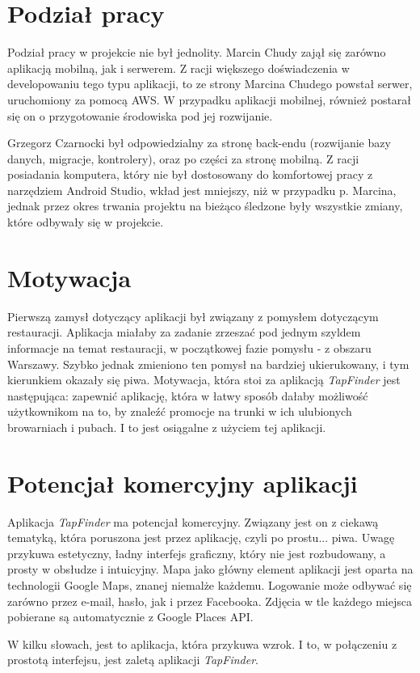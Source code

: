 \documentclass[a4paper]{article}
\begin{document}
\section{Podział pracy}

Podział pracy w projekcie nie był jednolity. Marcin Chudy zajął się zarówno aplikacją mobilną, jak i serwerem. Z racji większego doświadczenia w developowaniu tego typu aplikacji, to ze strony Marcina Chudego powstał serwer, uruchomiony za pomocą AWS. W przypadku aplikacji mobilnej, również postarał się on o przygotowanie środowiska pod jej rozwijanie.

Grzegorz Czarnocki był odpowiedzialny za stronę back-endu (rozwijanie bazy danych, migracje, kontrolery), oraz po części za stronę mobilną. Z racji posiadania komputera, który nie był dostosowany do komfortowej pracy z narzędziem Android Studio, wkład jest mniejszy, niż w przypadku p. Marcina, jednak przez okres trwania projektu na bieżąco śledzone były wszystkie zmiany, które odbywały się w projekcie.

\section{Motywacja}

Pierwszą zamysł dotyczący aplikacji był związany z pomysłem dotyczącym restauracji. Aplikacja miałaby za zadanie zrzeszać pod jednym szyldem informacje na temat restauracji, w początkowej fazie pomysłu - z obszaru Warszawy. Szybko jednak zmieniono ten pomysł na bardziej ukierukowany, i tym kierunkiem okazały się piwa. Motywacja, która stoi za aplikacją \textit{TapFinder} jest następująca: zapewnić aplikację, która w łatwy sposób dałaby możliwość użytkownikom na to, by znaleźć promocje na trunki w ich ulubionych browarniach i pubach. I to jest osiągalne z użyciem tej aplikacji.

\section{Potencjał komercyjny aplikacji}

Aplikacja \textit{TapFinder} ma potencjał komercyjny. Związany jest on z ciekawą tematyką, która poruszona jest przez aplikację, czyli po prostu... piwa. Uwagę przykuwa estetyczny, ładny interfejs graficzny, który nie jest rozbudowany, a prosty w obsłudze i intuicyjny. Mapa jako główny element aplikacji jest oparta na technologii Google Maps, znanej niemalże każdemu. Logowanie może odbywać się zarówno przez e-mail, hasło, jak i przez Facebooka. Zdjęcia w tle każdego miejsca pobierane są automatycznie z Google Places API.

W kilku słowach, jest to aplikacja, która przykuwa wzrok. I to, w połączeniu z prostotą interfejsu, jest zaletą aplikacji \textit{TapFinder}.
\end{document}
